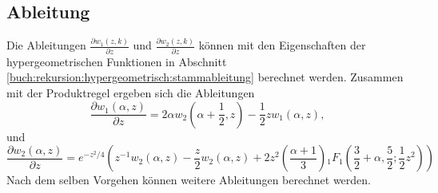\subsection{Ableitung}
Die Ableitungen $\frac{\partial w_1(z,k)}{\partial z}$ und $\frac{\partial w_2(z,k)}{\partial z}$ 
können mit den Eigenschaften der hypergeometrischen Funktionen in Abschnitt 
\ref{buch:rekursion:hypergeometrisch:stammableitung} berechnet werden. 
Zusammen mit der Produktregel ergeben sich die Ableitungen
\begin{equation}
	\frac{\partial w_1(\alpha,z)}{\partial z} = 2\alpha w_2(\alpha + \frac{1}{2}, z) - \frac{1}{2} z w_1(\alpha, z),
\end{equation} 
und
\begin{equation}
	\frac{\partial w_2(\alpha,z)}{\partial z} = e^{-z^2/4} \left(
		z^{-1} w_2(\alpha, z) - \frac{z}{2} w_2(\alpha, z) + 2 z^2 \left(\frac{\alpha + 1}{3}\right)
		{}_{1} F_{1} (
	{\textstyle \frac{3}{2}} 
	+ \alpha, {\textstyle \frac{5}{2}} ; {\textstyle \frac{1}{2}}z^2)
	\right)
\end{equation}
Nach dem selben Vorgehen können weitere Ableitungen berechnet werden.

